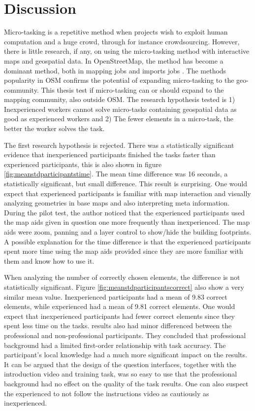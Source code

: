 \chapter{Discussion}
Micro-tasking is a repetitive method when projects wish to exploit human computation and a huge crowd, through for instance crowdsourcing. However, there is little research, if any, on using the micro-tasking method with interactive maps and geospatial data. In OpenStreetMap, the method has become a dominant method, both in mapping jobs and imports jobs \citep{Erichsen2016}. The methods popularity in OSM confirms the potential of expanding micro-tasking to the geo-community. This thesis test if micro-tasking can or should expand to the mapping community, also outside OSM. The research hypothesis tested is 1) Inexperienced workers cannot solve micro-tasks containing geospatial data as good as experienced workers and 2) The fewer elements in a micro-task, the better the worker solves the task.  

The first research hypothesis is rejected. There was a statistically significant evidence that inexperienced participants finished the tasks faster than experienced participants, this is also shown in figure \ref{fig:meanstdparticipantstime}. The mean time difference was 16 seconds, a statistically significant, but small difference. This result is surprising. One would expect that experienced participants is familiar with map interaction and visually analyzing geometries in base maps and also interpreting meta information. During the pilot test, the author noticed that the experienced participants used the map aids given in question one more frequently than inexperienced. The map aids were zoom, panning and a layer control to show/hide the building footprints. A possible explanation for the time difference is that the experienced participants spent more time using the map aids provided since they are more familiar with them and know how to use it. 

When analyzing the number of correctly chosen elements, the difference is not statistically significant. Figure \ref{fig:meanstdparticipantscorrect} also show a very similar mean value. Inexperienced participants had a mean of 9.83 correct elements, while experienced had a mean of 9.81 correct elements. One would expect that inexperienced participants had fewer correct elements since they spent less time on the tasks. \cite{Salk2016} results also had minor differenced between the professional and non-professional participants. They concluded that professional background had a limited first-order relationship with task accuracy. The participant's local knowledge had a much more significant impact on the results. It can be argued that the design of the question interfaces, together with the introduction video and training task, was so easy to use that the professional background had no effect on the quality of the task results. One can also suspect the experienced to not follow the instructions video as cautiously as inexperienced. 

